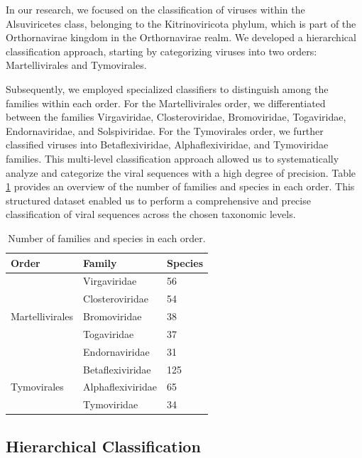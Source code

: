 In our research, we focused on the classification of viruses within the Alsuviricetes class, belonging to the Kitrinoviricota phylum, which is part of the Orthornavirae kingdom in the Orthornavirae realm. We developed a hierarchical classification approach, starting by categorizing viruses into two orders: Martellivirales and Tymovirales.

Subsequently, we employed specialized classifiers to distinguish among the families within each order. For the Martellivirales order, we differentiated between the families Virgaviridae, Closteroviridae, Bromoviridae, Togaviridae, Endornaviridae, and Solspiviridae. For the Tymovirales order, we further classified viruses into Betaflexiviridae, Alphaflexiviridae, and Tymoviridae families. This multi-level classification approach allowed us to systematically analyze and categorize the viral sequences with a high degree of precision. Table \ref{table:species_counts} provides an overview of the number of families and species in each order. This structured dataset enabled us to perform a comprehensive and precise classification of viral sequences across the chosen taxonomic levels.

\begin{table}[tb]
\centering
\begin{tabular}{| l | l | l |}
\hline
\textbf{Order} & \textbf{Family} & \textbf{Species} \\
\hline
\multirow{5}{*}{Martellivirales} & Virgaviridae & 56 \\
                                  & Closteroviridae & 54 \\
                                  & Bromoviridae & 38 \\
                                  & Togaviridae & 37 \\
                                  & Endornaviridae & 31 \\
\hline
\multirow{3}{*}{Tymovirales}     & Betaflexiviridae & 125 \\
                                  & Alphaflexiviridae & 65 \\
                                  & Tymoviridae & 34 \\
\hline
\end{tabular}
\caption{Number of families and species in each order.}
\label{table:species_counts}
\end{table}

\subsection{Hierarchical Classification}

